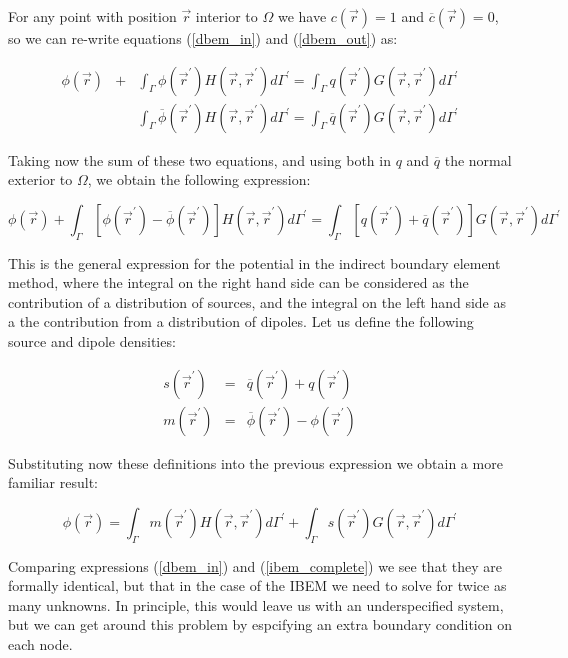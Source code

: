 \documentclass[12pt]{report}
\begin{document}
For any point with position $\vec{r}$ interior to $\Omega$ we have $c(\vec{r})=1$ and $\overline{c}(\vec{r})=0$, so we can re-write equations (\ref{dbem_in}) and (\ref{dbem_out}) as:

\begin{eqnarray}\phi(\vec{r})&+&\int_\Gamma{\phi(\vec{r}^\prime)H(\vec{r},\vec{r}^\prime)d\Gamma^\prime}=\int_\Gamma{q(\vec{r}^\prime)G(\vec{r},\vec{r}^\prime)d\Gamma^\prime}\\&&\int_\Gamma{\overline{\phi}(\vec{r}^\prime)H(\vec{r},\vec{r}^\prime)d\Gamma^\prime}=\int_\Gamma{\overline{q}(\vec{r}^\prime)G(\vec{r},\vec{r}^\prime)d\Gamma^\prime}\end{eqnarray}

Taking now the sum of these two equations, and using both in $q$ and $\overline{q}$ the normal exterior to $\Omega$, we obtain the following expression:

\begin{equation}
\phi(\vec{r})+\int_\Gamma{\left[\phi(\vec{r}^\prime)-\overline{\phi}(\vec{r}^\prime)\right]H(\vec{r},\vec{r}^\prime)d\Gamma^\prime}=\int_\Gamma{\left[q(\vec{r}^\prime)+\overline{q}(\vec{r}^\prime)\right]G(\vec{r},\vec{r}^\prime)d\Gamma^\prime}
\end{equation}

This is the general expression for the potential in the indirect boundary element method, where the integral on the right hand side can be considered as the contribution of a distribution of sources, and the integral on the left hand side as a the contribution from a distribution of dipoles. Let us define the following source and dipole densities:

\begin{eqnarray}
s(\vec{r}^\prime)&=&\overline{q}(\vec{r}^\prime)+q(\vec{r}^\prime)\label{source_density}\\
m(\vec{r}^\prime)&=&\overline{\phi}(\vec{r}^\prime)-\phi(\vec{r}^\prime)\label{dipole_density}
\end{eqnarray}

Substituting now these definitions into the previous expression we obtain a more familiar result:

\begin{equation}
\phi(\vec{r})=\int_\Gamma{m(\vec{r}^\prime)H(\vec{r},\vec{r}^\prime)d\Gamma^\prime}+\int_\Gamma{s(\vec{r}^\prime)G(\vec{r},\vec{r}^\prime)d\Gamma^\prime}\label{ibem_complete}
\end{equation}

Comparing expressions (\ref{dbem_in}) and (\ref{ibem_complete}) we see that they are formally identical, but that in the case of the IBEM we need to solve for twice as many unknowns. In principle, this would leave us with an underspecified system, but we can get around this problem by espcifying an extra boundary condition on each node.
\end{document}
